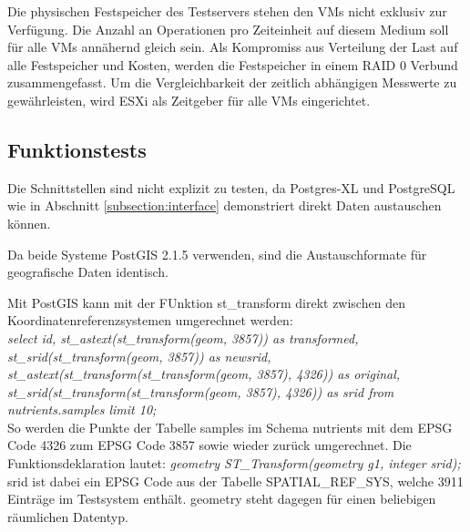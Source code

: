 Die physischen Festspeicher des Testservers stehen den VMs nicht exklusiv zur Verfügung.
Die Anzahl an Operationen pro Zeiteinheit auf diesem Medium soll für alle VMs annähernd gleich sein.
Als Kompromiss aus Verteilung der Last auf alle Festspeicher und Kosten, werden die Festspeicher in einem RAID 0 Verbund zusammengefasst.
Um die Vergleichbarkeit der zeitlich abhängigen Messwerte zu gewährleisten, wird ESXi als Zeitgeber für alle VMs eingerichtet.


\subsection{Funktionstests}
Die Schnittstellen sind nicht explizit zu testen, da Postgres-XL und PostgreSQL wie in Abschnitt \ref{subsection:interface} demonstriert direkt Daten austauschen können.

Da beide Systeme PostGIS 2.1.5 verwenden, sind die Austauschformate für geografische Daten identisch.

Mit PostGIS kann mit der FUnktion st\_{}transform direkt zwischen den Koordinatenreferenzsystemen umgerechnet werden:\\
\textit{select id, st\_{}astext(st\_{}transform(geom, 3857)) as transformed, st\_{}srid(st\_{}transform(geom, 3857)) as newsrid, st\_{}astext(st\_{}transform(st\_{}transform(geom, 3857), 4326)) as original, st\_{}srid(st\_{}transform(st\_{}transform(geom, 3857), 4326)) as srid from nutrients.samples limit 10;}\\
So werden die Punkte der Tabelle samples im Schema nutrients mit dem EPSG Code 4326 zum EPSG Code 3857 sowie wieder zurück umgerechnet.
Die Funktionsdeklaration lautet:
\textit{geometry ST\_{}Transform(geometry g1, integer srid);}\\
srid ist dabei ein EPSG Code aus der Tabelle SPATIAL\_{}REF\_{}SYS, welche 3911 Einträge im Testsystem enthält.
geometry steht dagegen für einen beliebigen räumlichen Datentyp.



